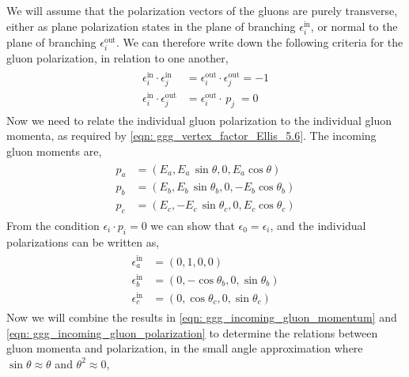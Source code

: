 \documentclass[main.tex]{subfiles}
\begin{document}
We will assume that the polarization vectors of the gluons are purely transverse, either as plane polarization states in the plane of branching \(\epsilon_i^{\text{in}}\), or normal to the plane of branching \(\epsilon_i^{\text{out}}\). We can therefore write down the following criteria for the gluon polarization, in relation to one another,
\begin{align}\label{eqn: gluon_polarization_criteria_ellis_5.7}
    \begin{split}
    \epsilon_i^{\text{in}} \cdot \epsilon_j^{\text{in}} &= \epsilon_i^{\text{out}} \cdot \epsilon_j^{\text{out}} = -1  \\
    \epsilon_i^{\text{in}} \cdot \epsilon_j^{\text{out}} &= \epsilon_i^{\text{out}} \cdot \, p_j \; = 0
    \end{split}
\end{align}
Now we need to relate the individual gluon polarization to the individual gluon momenta, as required by \autoref{eqn: ggg_vertex_factor_Ellis_5.6}. The incoming gluon moments are,
\begin{align}\label{eqn: ggg_incoming_gluon_momentum}
    \begin{split}
    p_a &= \left( E_a, E_a \, \sin \theta, 0, E_a \cos \theta \right)  \\
    p_b &= \left( E_b, E_b \, \sin \theta_b, 0, -E_b \cos \theta_b \right) \\
    p_c &= \left( E_c, -E_c \, \sin \theta_c, 0, E_c \cos \theta_c \right) 
    \end{split}
\end{align}
From the condition \(\epsilon_i \cdot p_i =0\) we can show that \(\epsilon_0 = \epsilon_i\), 
and the individual polarizations can be written as, 
\begin{align}\label{eqn: ggg_incoming_gluon_polarization}
    \begin{split}
    \epsilon^{\text{in}}_a &= \left( 0, 1, 0, 0\right)  \\
    \epsilon^{\text{in}}_b &= \left( 0, - \cos \theta_b, 0, \sin \theta_b \right) \\
    \epsilon^{\text{in}}_c &= \left( 0, \cos \theta_c, 0, \sin \theta_c \right) 
    \end{split}
\end{align}
Now we will combine the results in \autoref{eqn: ggg_incoming_gluon_momentum} and \autoref{eqn: ggg_incoming_gluon_polarization} to determine the relations between gluon momenta and polarization, in the small angle approximation where \(\sin \theta \approx \theta\) and \(\theta^2 \approx 0\), 
\end{document}
